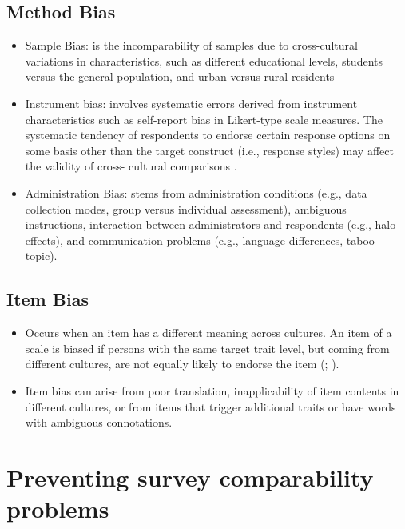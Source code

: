 \documentclass[
]{book}
\begin{document}
\hypertarget{method-bias}{%
\subsection{Method Bias}\label{method-bias}}

\begin{itemize}
\item
  Sample Bias: is the incomparability of samples due to cross-cultural variations in characteristics, such as different educational levels, students versus the general population, and urban versus rural residents
\item
  Instrument bias: involves systematic errors derived from instrument characteristics such as self-report bias in Likert-type scale measures. The systematic tendency of respondents to endorse certain response options on some basis other than the target construct (i.e., response styles) may affect the validity of cross- cultural comparisons \citep{VanHerk2004}.
\item
  Administration Bias: stems from administration conditions (e.g., data collection modes, group versus individual assessment), ambiguous instructions, interaction between administrators and respondents (e.g., halo effects), and communication problems (e.g., language differences, taboo topic).
\end{itemize}

\hypertarget{item-bias}{%
\subsection{Item Bias}\label{item-bias}}

\begin{itemize}
\item
  Occurs when an item has a different meaning across cultures. An item of a scale is biased if persons with the same target trait level, but coming from different cultures, are not equally likely to endorse the item (\citet{VandeVijver1997}; \citet{VandeVijver2013}).
\item
  Item bias can arise from poor translation, inapplicability of item contents in different cultures, or from items that trigger additional traits or have words with ambiguous connotations.
\end{itemize}

\hypertarget{preventing-survey-comparability-problems}{%
\section{Preventing survey comparability problems}\label{preventing-survey-comparability-problems}}
\end{document}
